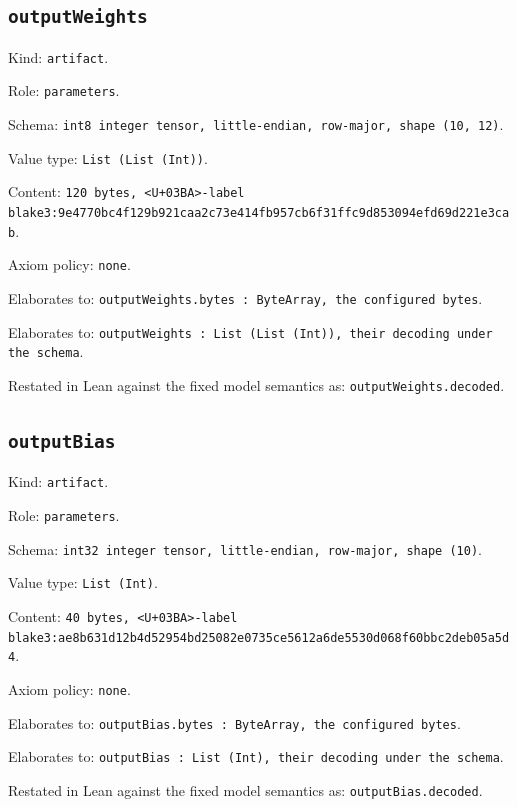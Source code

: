 \documentclass[11pt]{article}
\begin{document}
\subsection*{\texttt{outputWeights}}
\noindent Kind: \texttt{artifact}.\par
\noindent Role: \texttt{parameters}.\par
\noindent Schema: \texttt{int8 integer tensor, little-endian, row-major, shape (10, 12)}.\par
\noindent Value type: \texttt{List (List (Int))}.\par
\noindent Content: \texttt{120 bytes, <U+03BA>-label blake3:9e4770bc4f129b921caa2c73e414fb957cb6f31ffc9d853094efd69d221e3cab}.\par
\noindent Axiom policy: \texttt{none}.\par
\noindent Elaborates to: \texttt{outputWeights.bytes : ByteArray, the configured bytes}.\par
\noindent Elaborates to: \texttt{outputWeights : List (List (Int)), their decoding under the schema}.\par
\noindent Restated in Lean against the fixed model semantics as: \texttt{outputWeights.decoded}.\par
\subsection*{\texttt{outputBias}}
\noindent Kind: \texttt{artifact}.\par
\noindent Role: \texttt{parameters}.\par
\noindent Schema: \texttt{int32 integer tensor, little-endian, row-major, shape (10)}.\par
\noindent Value type: \texttt{List (Int)}.\par
\noindent Content: \texttt{40 bytes, <U+03BA>-label blake3:ae8b631d12b4d52954bd25082e0735ce5612a6de5530d068f60bbc2deb05a5d4}.\par
\noindent Axiom policy: \texttt{none}.\par
\noindent Elaborates to: \texttt{outputBias.bytes : ByteArray, the configured bytes}.\par
\noindent Elaborates to: \texttt{outputBias : List (Int), their decoding under the schema}.\par
\noindent Restated in Lean against the fixed model semantics as: \texttt{outputBias.decoded}.\par
\end{document}
